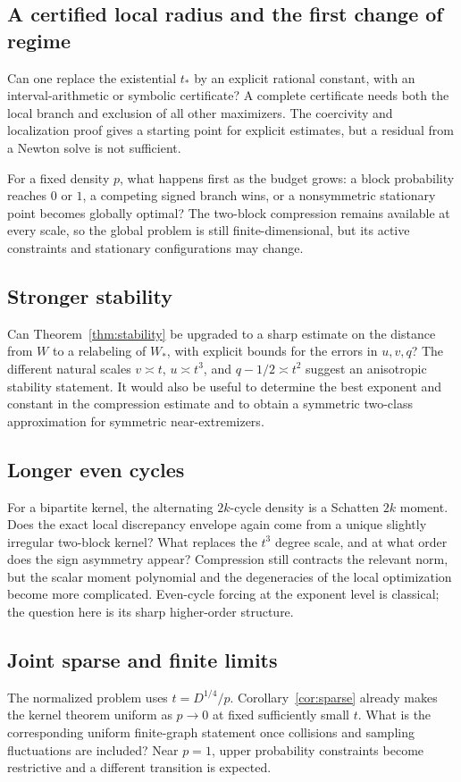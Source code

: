 \documentclass[11pt]{article}
\theoremstyle{definition}
\newcommand{\1}{\mathbf 1}
\begin{document}
\subsection{A certified local radius and the first change of regime}
Can one replace the existential $t_*$ by an explicit rational constant, with an interval-arithmetic or symbolic certificate? A complete certificate needs both the local branch and exclusion of all other maximizers. The coercivity and localization proof gives a starting point for explicit estimates, but a residual from a Newton solve is not sufficient.

For a fixed density $p$, what happens first as the budget grows: a block probability reaches $0$ or $1$, a competing signed branch wins, or a nonsymmetric stationary point becomes globally optimal? The two-block compression remains available at every scale, so the global problem is still finite-dimensional, but its active constraints and stationary configurations may change.

\subsection{Stronger stability}
Can Theorem~\ref{thm:stability} be upgraded to a sharp estimate on the distance from $W$ to a relabeling of $W_*$, with explicit bounds for the errors in $u,v,q$? The different natural scales $v\asymp t$, $u\asymp t^3$, and $q-1/2\asymp t^2$ suggest an anisotropic stability statement. It would also be useful to determine the best exponent and constant in the compression estimate and to obtain a symmetric two-class approximation for symmetric near-extremizers.

\subsection{Longer even cycles}
For a bipartite kernel, the alternating $2k$-cycle density is a Schatten $2k$ moment. Does the exact local discrepancy envelope again come from a unique slightly irregular two-block kernel? What replaces the $t^3$ degree scale, and at what order does the sign asymmetry appear? Compression still contracts the relevant norm, but the scalar moment polynomial and the degeneracies of the local optimization become more complicated. Even-cycle forcing at the exponent level is classical; the question here is its sharp higher-order structure.

\subsection{Joint sparse and finite limits}
The normalized problem uses $t=D^{1/4}/p$. Corollary~\ref{cor:sparse} already makes the kernel theorem uniform as $p\to0$ at fixed sufficiently small $t$. What is the corresponding uniform finite-graph statement once collisions and sampling fluctuations are included? Near $p=1$, upper probability constraints become restrictive and a different transition is expected.
\end{document}
